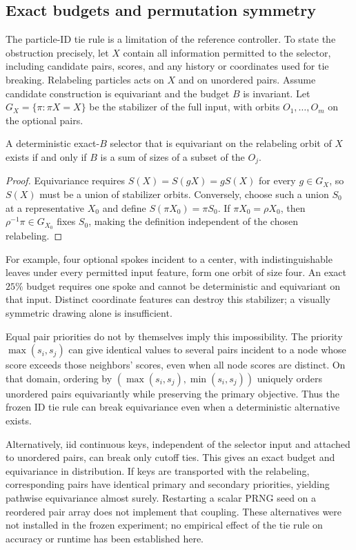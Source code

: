\subsection{Exact budgets and permutation symmetry}
\label{sec:tie-symmetry}
The particle-ID tie rule is a limitation of the reference controller. To state
the obstruction precisely, let $X$ contain all information permitted to the
selector, including candidate pairs, scores, and any history or coordinates
used for tie breaking. Relabeling particles acts on $X$ and on unordered pairs.
Assume candidate construction is equivariant and the budget $B$ is invariant.
Let $G_X=\{\pi:\pi X=X\}$ be the stabilizer of the full input, with orbits
$O_1,\ldots,O_m$ on the optional pairs.

\begin{proposition}
A deterministic exact-$B$ selector that is equivariant on the relabeling orbit
of $X$ exists if and only if $B$ is a sum of sizes of a subset of the $O_j$.
\end{proposition}
\begin{proof}
Equivariance requires $S(X)=S(gX)=gS(X)$ for every $g\in G_X$, so $S(X)$ must
be a union of stabilizer orbits. Conversely, choose such a union $S_0$ at a
representative $X_0$ and define $S(\pi X_0)=\pi S_0$. If
$\pi X_0=\rho X_0$, then $\rho^{-1}\pi\in G_{X_0}$ fixes $S_0$, making the
definition independent of the chosen relabeling.
\end{proof}

For example, four optional spokes incident to a center, with indistinguishable
leaves under every permitted input feature, form one orbit of size four. An
exact $25\%$ budget requires one spoke and cannot be deterministic and
equivariant on that input. Distinct coordinate features can destroy this
stabilizer; a visually symmetric drawing alone is insufficient.

Equal pair priorities do not by themselves imply this impossibility.
The priority $\max(s_i,s_j)$ can give identical values to several pairs incident
to a node whose score exceeds those neighbors' scores, even when all node scores are distinct. On that domain,
ordering by $(\max(s_i,s_j),\min(s_i,s_j))$ uniquely orders unordered pairs
equivariantly while preserving the primary objective. Thus the frozen ID tie
rule can break equivariance even when a deterministic alternative exists.

Alternatively, iid continuous keys, independent of the selector input and
attached to unordered pairs, can break only cutoff ties. This gives an exact budget and equivariance in
distribution. If keys are transported with the relabeling, corresponding
pairs have identical primary and secondary priorities, yielding pathwise
equivariance almost surely. Restarting a scalar PRNG seed on a reordered pair
array does not implement that coupling. These alternatives were not installed
in the frozen experiment; no empirical effect of the tie rule on accuracy or
runtime has been established here.
